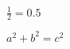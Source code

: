 \documentclass[
  multi={mymath},
  border=2pt,
  convert={convertexe={D:/0dev/tools/imagemagick/convert},density=300,outext=.png}
  ]{standalone}
\newenvironment{mymath}{$\displaystyle}{$}
\begin{document}
\begin{mymath}
  \frac{1}{2}=0.5
\end{mymath}

\begin{mymath}
  a^2 + b^2 = c^2
\end{mymath}
\end{document}
